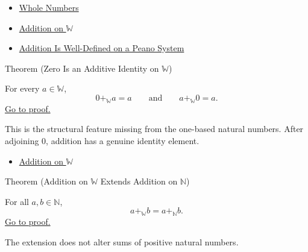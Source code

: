 \begin{dependencies}
\begin{itemize}
  \item \hyperref[def:whole-numbers]{Whole Numbers}
  \item \hyperref[def:addition-on-w]{Addition on $\mathbb{W}$}
  \item \hyperref[thm:addition-well-defined-on-peano-system]{Addition Is Well-Defined on a Peano System}
\end{itemize}
\end{dependencies}

\begin{theorembox}{Theorem (Zero Is an Additive Identity on \texorpdfstring{$\mathbb{W}$}{W})}
\begin{theorem}
\label{thm:zero-additive-identity-on-w}
For every $a\in\mathbb{W}$,
\[
0+_{\mathbb{W}}a=a
\qquad\text{and}\qquad
a+_{\mathbb{W}}0=a.
\]
\hyperref[prf:zero-additive-identity-on-w]{Go to proof.}
\end{theorem}
\end{theorembox}

\begin{remark*}[Interpretation]
This is the structural feature missing from the one-based natural numbers.
After adjoining $0$, addition has a genuine identity element.
\end{remark*}

\begin{dependencies}
\begin{itemize}
  \item \hyperref[def:addition-on-w]{Addition on $\mathbb{W}$}
\end{itemize}
\end{dependencies}

\begin{theorembox}{Theorem (Addition on \texorpdfstring{$\mathbb{W}$}{W} Extends Addition on \texorpdfstring{$\mathbb{N}$}{N})}
\begin{theorem}
\label{thm:addition-on-w-extends-addition-on-n}
For all $a,b\in\mathbb{N}$,
\[
a+_{\mathbb{W}}b=a+_{\mathbb{N}}b.
\]
\hyperref[prf:addition-on-w-extends-addition-on-n]{Go to proof.}
\end{theorem}
\end{theorembox}

\begin{remark*}[Interpretation]
The extension does not alter sums of positive natural numbers.
\end{remark*}

